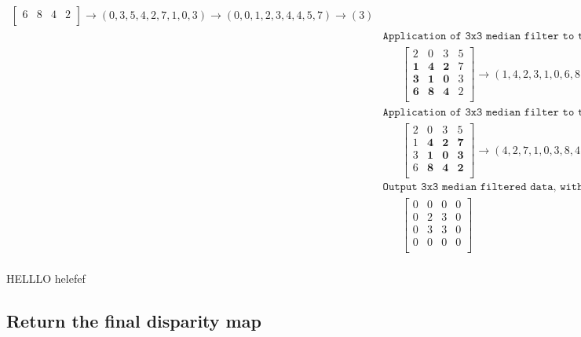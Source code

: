 \documentclass[11pt,fleqn]{article}
\begin{document}
\begin{equation*}
\begin{aligned}
\begin{bmatrix}
6 & 8 & 4 & 2 \\ 
\end{bmatrix} 
\rightarrow (0, 3, 5, 4, 2, 7, 1, 0, 3) \rightarrow (0, 0, 1, 2, 3, 4, 4, 5, 7) \rightarrow (3) \\[10pt]
%
& \texttt{Application of 3x3 median filter to the $(3,2)$ interior filter location}\\
& \hspace{20pt} \begin{bmatrix}
2 & 0 & 3 & 5 \\
\mathbf{1} & \mathbf{4} & \mathbf{2} & 7 \\
\mathbf{3} & \mathbf{1} & \mathbf{0} & 3 \\
\mathbf{6} & \mathbf{8} & \mathbf{4} & 2 \\ 
\end{bmatrix} 
\rightarrow (1, 4, 2, 3, 1, 0, 6, 8, 4) \rightarrow (0, 1, 1, 2, 3, 4, 4, 6, 8) \rightarrow (3) \\[10pt]
%
& \texttt{Application of 3x3 median filter to the $(3,3)$ interior filter location}\\
& \hspace{20pt} \begin{bmatrix}
2 & 0 & 3 & 5 \\
1 & \mathbf{4} & \mathbf{2} & \mathbf{7} \\
3 & \mathbf{1} & \mathbf{0} & \mathbf{3} \\
6 & \mathbf{8} & \mathbf{4} & \mathbf{2} \\ 
\end{bmatrix} 
\rightarrow (4, 2, 7, 1, 0, 3, 8, 4, 2) \rightarrow (0, 1, 2, 2, 3, 4, 4, 7, 8) \rightarrow (3) \\[10pt]
%
& \texttt{Output 3x3 median filtered data, with edge locations zeroed}\\
& \hspace{20pt} \begin{bmatrix}
0 & 0 & 0 & 0 \\
0 & 2 & 3 & 0 \\
0 & 3 & 3 & 0 \\
0 & 0 & 0 & 0 \\ 
\end{bmatrix} \\[10pt]
\end{aligned}
\end{equation*}

HELLLO
helefef

\subsection{Return the final disparity map}
\end{document}
